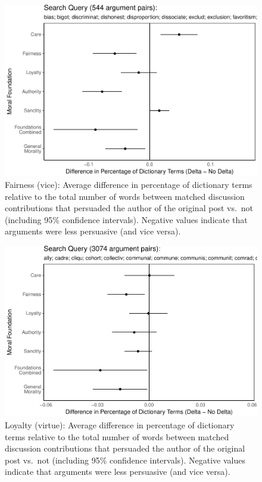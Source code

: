 \documentclass[12pt,]{article}
\begin{document}
\begin{figure}
\centering
\includegraphics{prelim_files/figure-latex/fairness vice-1.pdf}
\caption{Fairness (vice): Average difference in percentage of dictionary
terms relative to the total number of words between matched discussion
contributions that persuaded the author of the original post vs.~not
(including 95\% confidence intervals). Negative values indicate that
arguments were less persuasive (and vice versa).}
\end{figure}

\begin{figure}
\centering
\includegraphics{prelim_files/figure-latex/ingroup virtue-1.pdf}
\caption{Loyalty (virtue): Average difference in percentage of
dictionary terms relative to the total number of words between matched
discussion contributions that persuaded the author of the original post
vs.~not (including 95\% confidence intervals). Negative values indicate
that arguments were less persuasive (and vice versa).}
\end{figure}
\end{document}
